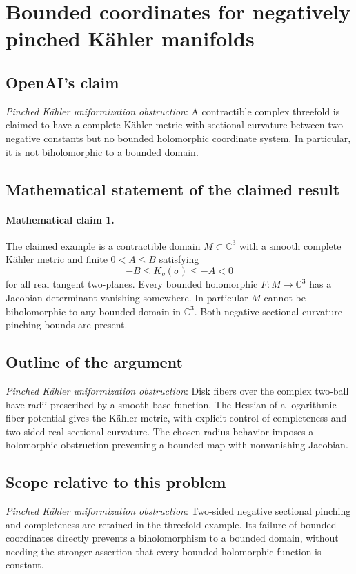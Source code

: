 \documentclass[11pt]{article}
\begin{document}
\section*{Bounded coordinates for negatively pinched Kähler manifolds}

\subsection{OpenAI's claim}
\textit{Pinched Kähler uniformization obstruction}: A contractible complex threefold is claimed to have a complete Kähler metric with sectional curvature between two negative constants but no bounded holomorphic coordinate system. In particular, it is not biholomorphic to a bounded domain.

\subsection{Mathematical statement of the claimed result}
\paragraph{Mathematical claim 1.} The claimed example is a contractible domain $M\subset\mathbb C^3$ with a smooth complete K\"ahler metric and finite $0<A\le B$ satisfying \[-B\le K_g(\sigma)\le-A<0\] for all real tangent two-planes. Every bounded holomorphic $F:M\to\mathbb C^3$ has a Jacobian determinant vanishing somewhere. In particular $M$ cannot be biholomorphic to any bounded domain in $\mathbb C^3$. Both negative sectional-curvature pinching bounds are present.

\subsection{Outline of the argument}
\textit{Pinched Kähler uniformization obstruction}: Disk fibers over the complex two-ball have radii prescribed by a smooth base function. The Hessian of a logarithmic fiber potential gives the Kähler metric, with explicit control of completeness and two-sided real sectional curvature. The chosen radius behavior imposes a holomorphic obstruction preventing a bounded map with nonvanishing Jacobian.

\subsection{Scope relative to this problem}
\textit{Pinched Kähler uniformization obstruction}: Two-sided negative sectional pinching and completeness are retained in the threefold example. Its failure of bounded coordinates directly prevents a biholomorphism to a bounded domain, without needing the stronger assertion that every bounded holomorphic function is constant.
\end{document}
